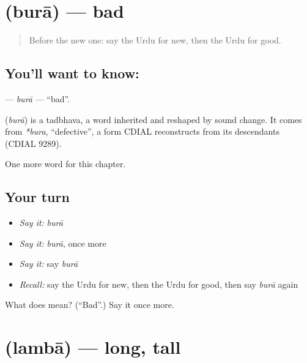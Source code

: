 \section[\texorpdfstring{\ur{برا} (burā)}{برا (burā)}]{ (burā) — bad}

\label{lesson:UR-C70-bura}



\begin{quote}
Before the new one: say the Urdu for new, then the Urdu for good.
\end{quote}

\subsection*{You'll want to know: }
\textbf{} — \emph{burā} — \textquotedblleft{}bad\textquotedblright{}.

\begin{cousinweb}
\textbf{} (\emph{burā}) is a tadbhava, a word inherited and reshaped by sound change. It comes from \emph{*bura}, \textquotedblleft{}defective\textquotedblright{}, a form CDIAL reconstructs from its descendants (CDIAL 9289).
\end{cousinweb}

\begin{grammarlens}[title={What you've built}]
One more word for this chapter.
\end{grammarlens}

\subsection*{Your turn}
\begin{itemize}
\raggedright
  \item \emph{Say it:} \emph{burā}
  \item \emph{Say it:} \emph{burā}, once more
  \item \emph{Say it:} say \emph{burā}
  \item \emph{Recall:} say the Urdu for new, then the Urdu for good, then say \emph{burā} again
\end{itemize}

\begin{tcolorbox}[breakable,colback=teal!4,colframe=teal!35!black,title={Before you move on}]
What does  mean? (\textquotedblleft{}Bad\textquotedblright{}.) Say it once more.
\end{tcolorbox}
\section[\texorpdfstring{\ur{لمبا} (lambā)}{لمبا (lambā)}]{ (lambā) — long, tall}

